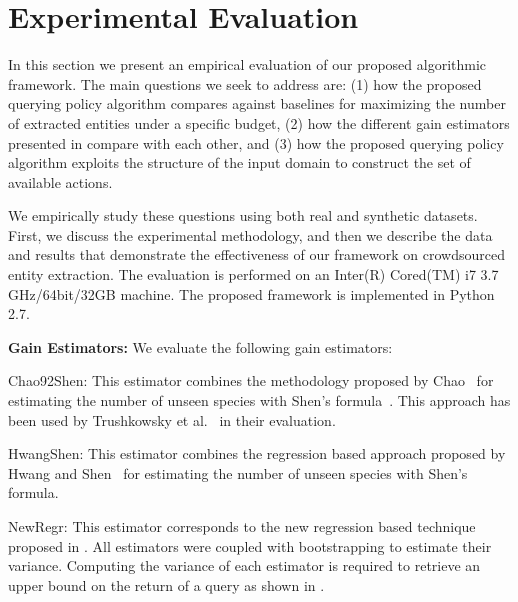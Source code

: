 \section{Experimental Evaluation}
\label{sec:exps}
In this section we present an empirical evaluation of our proposed algorithmic framework. The main questions we seek to address are: (1) how the proposed querying policy algorithm compares against baselines for maximizing the number of extracted entities under a specific budget, (2) how the different gain estimators presented in  compare with each other, and (3) how the proposed querying policy algorithm exploits the structure of the input domain to construct the set of available actions.

We empirically study these questions using both real and synthetic datasets. First, we discuss the experimental methodology, and then we describe the data and results that demonstrate the effectiveness of our framework on crowdsourced entity extraction. The evaluation is performed on an Inter(R) Cored(TM) i7 3.7 GHz/64bit/32GB machine. The proposed framework is implemented in Python 2.7. 

\vspace{5pt}\noindent\textbf{Gain Estimators:} We evaluate the following gain estimators:
\squishlist
\item Chao92Shen: This estimator combines the methodology proposed by Chao~\cite{chao:1992} for estimating the number of unseen species  with Shen's formula~. This approach has been used by Trushkowsky et al.~\cite{trushkowsky:2013} in their evaluation.
\item HwangShen: This estimator combines the regression based approach proposed by Hwang and Shen~\cite{hwang:2010} for estimating the number of unseen species with Shen's formula. 
\item NewRegr: This estimator corresponds to the new regression based technique proposed in .
\squishend
All estimators were coupled with bootstrapping to estimate their variance. Computing the variance of each estimator is required to retrieve an upper bound on the return of a query as shown in .

